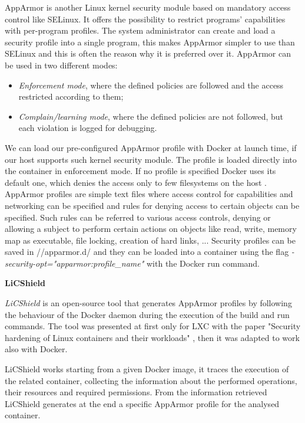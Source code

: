\documentclass[a4paper,12pt]{article}
\begin{document}
AppArmor is another Linux kernel security module based on mandatory access
control like SELinux. It offers the possibility to restrict programs'
capabilities with per-program profiles. The system administrator can create and
load a security profile into a single program, this makes AppArmor simpler to
use than SELinux and this is often the reason why it is preferred over it.
AppArmor can be used in two different modes:
\begin{itemize}
  \item \textit{Enforcement mode}, where the defined policies are followed and
  the access restricted according to them; 
  \item \textit{Complain/learning mode}, where the defined policies are not
  followed, but each violation is logged for debugging.
\end{itemize}
\par We can load our pre-configured AppArmor profile with Docker at launch time,
if our host supports such kernel security module. The profile is loaded directly
into the container in enforcement mode. If no profile is specified Docker uses
its default one, which denies the access only to few filesystems on the host
 \cite{bui_docker_security}. AppArmor profiles are simple text files where access
control for capabilities and networking can be specified and rules for denying
access to certain objects can be specified. Such rules can be referred to
various access controls, denying or allowing a subject to perform certain
actions on objects like read, write, memory map as executable, file locking,
creation of hard links, ... Security profiles can be saved in
//apparmor.d/ and they can be loaded into a container using the flag
\textit{-security-opt="apparmor:profile\_name"} with the Docker run command. 

\bigbreak\textbf{LiCShield}\bigbreak 

\textit{LiCShield} \cite{licshield} is an open-source tool that generates
AppArmor profiles by following the behaviour of the Docker daemon during the
execution of the build and run commands. The tool was presented at first only
for LXC with the paper "Security hardening of Linux containers and their
workloads" \cite{licshield_paper}, then it was adapted to work also with Docker.
\par LiCShield works starting from a given Docker image, it traces the execution
of the related container, collecting the information about the performed
operations, their resources and required permissions. From the information
retrieved LiCShield generates at the end a specific AppArmor profile for the
analysed container. 
\end{document}
